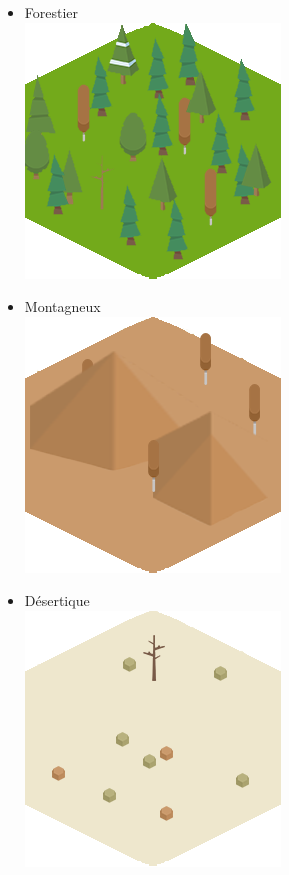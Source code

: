  \begin{itemize}
    \item Forestier\\
    \includegraphics[scale=0.31]{ground/fo.png}\\
    \item Montagneux\\
    \includegraphics[scale=0.31]{ground/mo.png}\\
    \item Désertique\\
    \includegraphics[scale=0.31]{ground/de.png}\\

\end{itemize}
